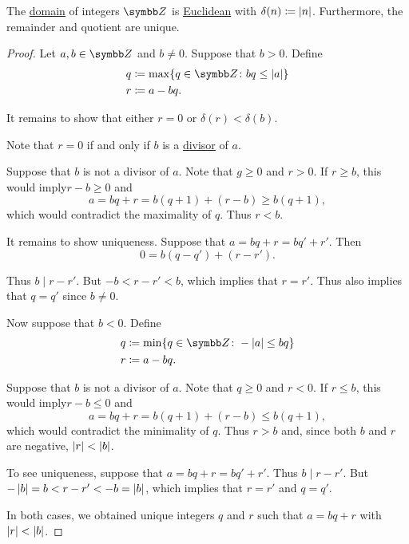 \begin{proposition}\label{thm:integers_are_euclidean_domain}
  The \hyperref[def:semiring/integral_domain]{domain} of integers \( \BZ \) is \hyperref[def:semiring/euclidean_domain]{Euclidean} with \( \delta(n) \coloneqq \left\vert n \right\vert \). Furthermore, the remainder and quotient are unique.
\end{proposition}
\begin{proof}
  Let \( a, b \in \BZ \) and \( b \neq 0 \). Suppose that \( b > 0 \). Define
  \begin{align*}
    q & \coloneqq \max \{ q \in \BZ \colon bq \leq \Abs{a} \} \\
    r & \coloneqq a - bq.
  \end{align*}

  It remains to show that either \( r = 0 \) or \( \delta(r) < \delta(b) \).

  Note that \( r = 0 \) if and only if \( b \) is a \hyperref[def:commutative_ring_division]{divisor} of \( a \).

  Suppose that \( b \) is not a divisor of \( a \). Note that \( g \geq 0 \) and \( r > 0 \). If \( r \geq b \), this would imply\LEM \( r - b \geq 0 \) and
  \begin{equation*}
    a = bq + r = b(q + 1) + (r - b) \geq b(q + 1),
  \end{equation*}
  which would contradict the maximality of \( q \). Thus \( r < b \).

  It remains to show uniqueness. Suppose that \( a = bq + r = bq' + r' \). Then
  \begin{equation*}
    0 = b(q - q') + (r - r').
  \end{equation*}

  Thus \( b \mid r - r' \). But \( -b < r - r' < b \), which implies that \( r = r' \). Thus also implies that \( q = q' \) since \( b \neq 0 \).

  Now suppose that \( b < 0 \). Define
  \begin{align*}
    q & \coloneqq \min \{ q \in \BZ \colon -\Abs{a} \leq bq \} \\
    r & \coloneqq a - bq.
  \end{align*}

  Suppose that \( b \) is not a divisor of \( a \). Note that \( q \geq 0 \) and \( r < 0 \). If \( r \leq b \), this would imply\LEM \( r - b \leq 0 \) and
  \begin{equation*}
    a = bq + r = b(q + 1) + (r - b) \leq b(q + 1),
  \end{equation*}
  which would contradict the minimality of \( q \). Thus \( r > b \) and, since both \( b \) and \( r \) are negative, \( \left\vert r \right\vert < \left\vert b \right\vert \).

  To see uniqueness, suppose that \( a = bq + r = bq' + r' \). Thus \( b \mid r - r' \). But \( -\left\vert b \right\vert = b < r - r' < -b = \left\vert b \right\vert \), which implies that \( r = r' \) and \( q = q' \).

  In both cases, we obtained unique integers \( q \) and \( r \) such that \( a = bq + r \) with \( \left\vert r \right\vert < \left\vert b \right\vert \).
\end{proof}

